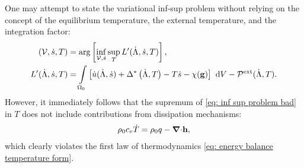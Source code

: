 \begin{remark}
One may attempt to state the variational inf-sup problem without relying on the concept of the equilibrium temperature, the external temperature, and the integration factor:
\begin{align}
    \left( \mathcal{V}, \dot{s}, T \right) &= \arg \left[ \inf_{\mathcal{V}, \dot{s}} \sup_T L'(\dot{\Lambda}, \dot{s}, T) \right], \label{eq: inf sup problem bad} \\
    L'(\dot{\Lambda}, \dot{s}, T) &= \int\limits_{\Omega_0} \left[ \dot{u}(\dot{\Lambda}, \dot{s}) + \Delta^*\left( \dot{\Lambda}, T \right) - T\dot{s} - \chi(\textbf{g}) \right] \text{ d}V - \mathcal{P}^\text{ext}(\dot{\Lambda}, T).
\end{align}
However, it immediately follows that the supremum of \eqref{eq: inf sup problem bad} in $T$ does not include contributions from dissipation mechanisms:
\begin{align}
    \rho_0 c_v \dot{T} = \rho_0 q - {\boldsymbol{\nabla} \cdot} \textbf{h},
\end{align}
which clearly violates the first law of thermodynamics \eqref{eq: energy balance temperature form}.
\end{remark}

